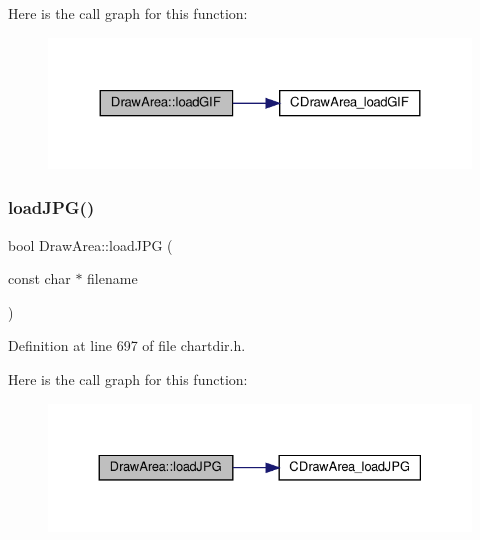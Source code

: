 Here is the call graph for this function\+:
\nopagebreak
\begin{figure}[H]
\begin{center}
\leavevmode
\includegraphics[width=324pt]{class_draw_area_acfa51d737299f007c15e38e9c71c6d74_cgraph}
\end{center}
\end{figure}
\mbox{\label{class_draw_area_a9c72a759f1b0f166272994a5f42362bf}} 
\subsubsection{\texorpdfstring{load\+J\+P\+G()}{loadJPG()}}
{\footnotesize\ttfamily bool Draw\+Area\+::load\+J\+PG (\begin{DoxyParamCaption}\item[{const char $\ast$}]{filename }\end{DoxyParamCaption})\hspace{0.3cm}{\ttfamily [inline]}}



Definition at line 697 of file chartdir.\+h.

Here is the call graph for this function\+:
\nopagebreak
\begin{figure}[H]
\begin{center}
\leavevmode
\includegraphics[width=330pt]{class_draw_area_a9c72a759f1b0f166272994a5f42362bf_cgraph}
\end{center}
\end{figure}
\mbox{\label{class_draw_area_af5b2dd1d6eb5c3f973ad3fbe1c4d9a60}} 
